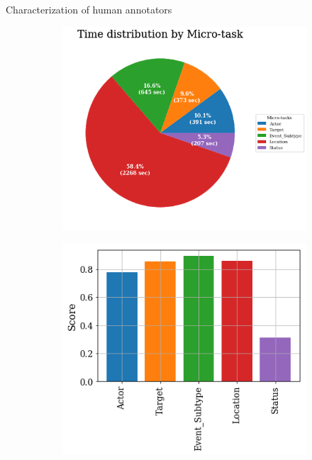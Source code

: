 \begin{frame}{Characterization of human annotators}
\begin{figure}
     \centering
     \begin{subfigure}[b]{0.5\textwidth}
         \centering
         \includegraphics[width=\textwidth]{Problem2/figures/micro_task_timings.png}
     \end{subfigure}%
     \hfill
     \begin{subfigure}[b]{0.5\textwidth}
         \centering
         \includegraphics[width=\textwidth]{Problem2/figures/micro_task_performance.png}
     \end{subfigure}
\end{figure}
    
\end{frame}

